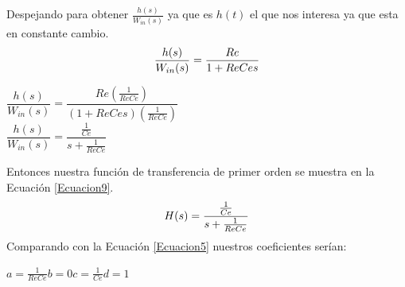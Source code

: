 \documentclass[12pt,a4paper]{article}
\begin{document}
Despejando para obtener $\frac{h(s)}{W_{in}(s)}$ ya que es $h(t)$ el que nos interesa ya que esta en constante cambio.
\begin{equation}
\centering
\dfrac{h(s)}{W_{in}(s)} = \dfrac{Re}{1 + ReCes}
\label{Ecuacioncod}
\end{equation}
\begin{center}
$\dfrac{h(s)}{W_{in}(s)} = \dfrac{Re(\frac{1}{ReCe})}{(1 + ReCes)(\frac{1}{ReCe})}$\\[12pt]
$\dfrac{h(s)}{W_{in}(s)} = \dfrac{\frac{1}{Ce}}{s + \frac{1}{ReCe}}$
\end{center}
Entonces nuestra función de transferencia de primer orden se muestra en la Ecuación \ref{Ecuacion9}.
\begin{equation}
\centering
H(s) = \dfrac{\frac{1}{Ce}}{s + \frac{1}{ReCe}}
\label{Ecuacion9}
\end{equation}
Comparando con la Ecuación \ref{Ecuacion5} nuestros coeficientes serían:
\begin{center}
$a = \frac{1}{ReCe}$\hspace{3cm}$b = 0$\hspace{3cm}$c = \frac{1}{Ce}$\hspace{3cm}$d = 1$\end{center}
\newpage

\end{document}
